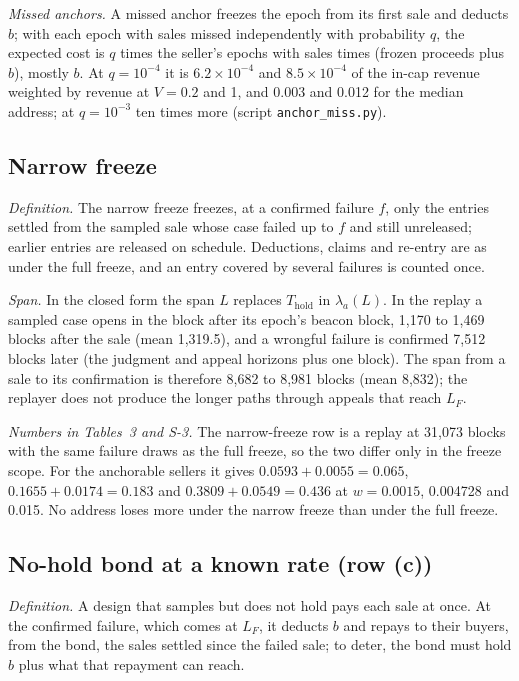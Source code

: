 \documentclass[10pt,a4paper]{article}
\newcommand{\Thold}{T_{\mathrm{hold}}}
\theoremstyle{plain}
\theoremstyle{remark}
\begin{document}
\emph{Missed anchors.} A missed anchor freezes the epoch from its first sale and deducts $b$; with each epoch with sales missed independently with probability $q$, the expected cost is $q$ times the seller's epochs with sales times (frozen proceeds plus $b$), mostly $b$. At $q=10^{-4}$ it is $6.2\times10^{-4}$ and $8.5\times10^{-4}$ of the in-cap revenue weighted by revenue at $V=0.2$ and 1, and 0.003 and 0.012 for the median address; at $q=10^{-3}$ ten times more (script \texttt{anchor\_miss.py}).

\subsection{Narrow freeze}

\emph{Definition.} The narrow freeze freezes, at a confirmed failure $f$, only the entries settled from the sampled sale whose case failed up to $f$ and still unreleased; earlier entries are released on schedule. Deductions, claims and re-entry are as under the full freeze, and an entry covered by several failures is counted once.

\emph{Span.} In the closed form the span $L$ replaces $\Thold$ in $\lambda_a(L)$. In the replay a sampled case opens in the block after its epoch's beacon block, 1,170 to 1,469 blocks after the sale (mean 1,319.5), and a wrongful failure is confirmed 7,512 blocks later (the judgment and appeal horizons plus one block). The span from a sale to its confirmation is therefore 8,682 to 8,981 blocks (mean 8,832); the replayer does not produce the longer paths through appeals that reach $L_F$.

\emph{Numbers in Tables~3 and S-3.} The narrow-freeze row is a replay at 31,073 blocks with the same failure draws as the full freeze, so the two differ only in the freeze scope. For the anchorable sellers it gives $0.0593+0.0055=0.065$, $0.1655+0.0174=0.183$ and $0.3809+0.0549=0.436$ at $w=0.0015$, 0.004728 and 0.015. No address loses more under the narrow freeze than under the full freeze.

\subsection{No-hold bond at a known rate (row (c))}

\emph{Definition.} A design that samples but does not hold pays each sale at once. At the confirmed failure, which comes at $L_F$, it deducts $b$ and repays to their buyers, from the bond, the sales settled since the failed sale; to deter, the bond must hold $b$ plus what that repayment can reach.
\end{document}
